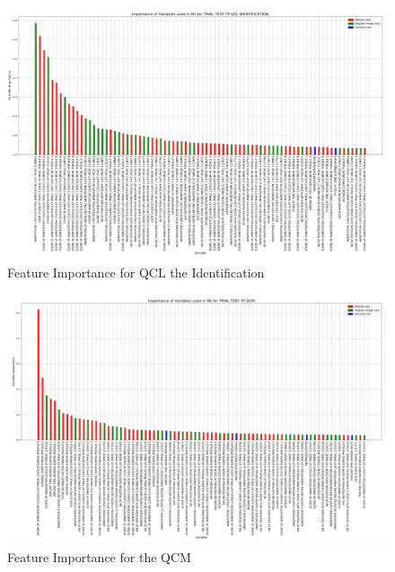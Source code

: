 \documentclass[a4paper,11pt]{report}
\numberwithin{figure}{chapter} %
\begin{document}
      \begin{figure}[H]
      \centering
      \includegraphics[width=.95\linewidth]{plots/var_importance_TRIAL_TEST_TP_QCL_IDENTIFICATION_2018-04-29_14_28_02.png}
      \caption{Feature Importance for QCL the Identification}
      \label{fig:var_white2}
      \end{figure}

      \begin{figure}[H]
      \centering
      \includegraphics[width=.95\linewidth]{plots/var_importance_TRIAL_TEST_TP_QCM_2018-04-29_14_34_16.png}
      \caption{Feature Importance for the QCM}
      \label{fig:var_white3}
      \end{figure}
\end{document}
